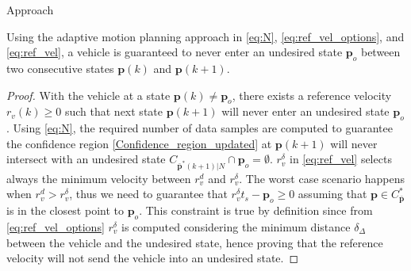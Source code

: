 \begin{section}{Approach}
\begin{lemma} 
	\label{lemma_2}
Using the adaptive motion planning approach in \eqref{eq:N}, \eqref{eq:ref_vel_options}, and \eqref{eq:ref_vel}, a vehicle is guaranteed to never enter an undesired state $\bm{p}_o$ between two consecutive states $\bm{p}(k)$ and $\bm{p}(k+1)$.

\end{lemma}

\begin{proof}
With the vehicle at a state $\bm{p}(k) \neq \bm{p}_o$, there exists a reference velocity $r_v(k)\geq0$ such that next state $\bm{p}(k+1)$ will never enter an undesired state $\bm{p}_o$. Using \eqref{eq:N}, the required number of data samples are computed to guarantee the confidence region \eqref{Confidence_region_updated} at $\bm{p}(k+1)$ will never intersect with an undesired state $C_{\bar{\bm{p}}^*(k+1)|N} \cap \bm{p}_o = \emptyset$. ${r}_v^{\delta}$ in \eqref{eq:ref_vel} selects always the minimum velocity between $r_v^{d}$ and $r_v^{\delta}$. The worst case scenario happens when $r_v^{d}>r_v^{\delta}$, thus we need to guarantee that $r_v^{\delta}t_s-\bm{p}_o\geq0$ assuming that $\bm{p}\in C_{\bar{\bm{p}}}^*$ is in the closest point to $\bm{p}_o$. This constraint is true by definition since from \eqref{eq:ref_vel_options} $ {r}_v^{\delta}$ is computed considering the minimum distance $\delta_{\Delta}$ between the vehicle and the undesired state, hence proving that the reference velocity will not send the vehicle into an undesired state. 

%
\end{proof}





\end{section}
